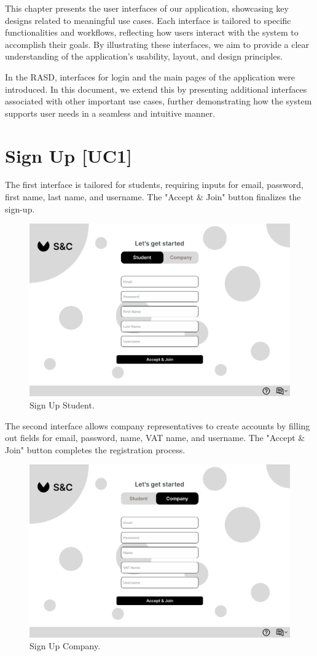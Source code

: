 This chapter presents the user interfaces of our application, showcasing key designs related to meaningful use cases. Each interface is tailored to specific functionalities and workflows, reflecting how users interact with the system to accomplish their goals. By illustrating these interfaces, we aim to provide a clear understanding of the application's usability, layout, and design principles.

In the RASD, interfaces for login and the main pages of the application were introduced. In this document, we extend this by presenting additional interfaces associated with other important use cases, further demonstrating how the system supports user needs in a seamless and intuitive manner.

\section{Sign Up [UC1]}
\label{sec:UI1_sign_up}%

The first interface is tailored for students, requiring inputs for email, password, first name, last name, and username. The "Accept \& Join" button finalizes the sign-up.

\begin{figure}[H]
    \centering
    \includegraphics[width=0.75\linewidth]{DD/Images/UI/Signin_Student.png}
    \caption{Sign Up Student.}
    \label{fig:signup_stud_ui}
\end{figure}

The second interface allows company representatives to create accounts by filling out fields for email, password, name, VAT name, and username. The "Accept \& Join" button completes the registration process.

\begin{figure}[H]
    \centering
    \includegraphics[width=0.75\linewidth]{DD/Images/UI/Signin_Company.png}
    \caption{Sign Up Company.}
    \label{fig:signup_comp_ui}
\end{figure}


